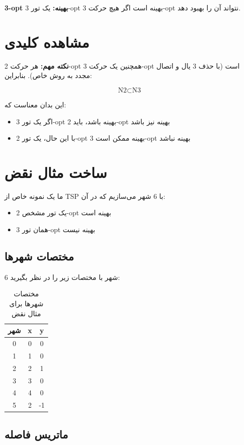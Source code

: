 \documentclass[12pt,a4paper]{article}
\begin{document}
\textbf{3-opt بهینه:} یک تور 3-opt بهینه است اگر هیچ حرکت 3-opt نتواند آن را بهبود دهد.

\section{مشاهده کلیدی}

\textbf{نکته مهم:} هر حرکت 2-opt همچنین یک حرکت 3-opt است (با حذف 3 یال و اتصال مجدد به روش خاص). بنابراین:

\[
\text{N2} \subset \text{N3}
\]

این بدان معناست که:
\begin{itemize}
    \item اگر یک تور 3-opt بهینه باشد، باید 2-opt بهینه نیز باشد
    \item با این حال، یک تور 2-opt بهینه ممکن است 3-opt بهینه نباشد
\end{itemize}

\section{ساخت مثال نقض}

ما یک نمونه خاص از TSP با 6 شهر می‌سازیم که در آن:
\begin{itemize}
    \item یک تور مشخص 2-opt بهینه است
    \item همان تور 3-opt بهینه نیست
\end{itemize}

\subsection{مختصات شهرها}

6 شهر با مختصات زیر را در نظر بگیرید:

\begin{table}[h]
\centering
\begin{tabular}{|c|c|c|}
\hline
\textbf{شهر} & \textbf{x} & \textbf{y} \\
\hline
0 & 0 & 0 \\
1 & 1 & 0 \\
2 & 2 & 1 \\
3 & 3 & 0 \\
4 & 4 & 0 \\
5 & 2 & -1 \\
\hline
\end{tabular}
\caption{مختصات شهرها برای مثال نقض}
\end{table}

\subsection{ماتریس فاصله}
\end{document}
